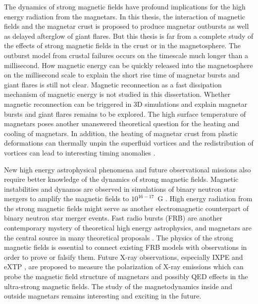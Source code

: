 The dynamics of strong magnetic fields have profound implications for the high energy radiation from the magnetars.
In this thesis, the interaction of magnetic fields and the magnetar crust is proposed to produce magnetar outbursts as well as delayed afterglow of giant flares.
But this thesis is far from a complete study of the effects of strong magnetic fields in the crust or in the magnetosphere.
The outburst model from crustal failures occurs on the timescale much longer than a millisecond.
How magnetic energy can be quickly released into the magnetosphere on the millisecond scale to explain the short rise time of magnetar bursts and giant flares is still not clear.
Magnetic reconnection as a fast dissipation mechanism of magnetic energy is not studied in this dissertation.
Whether magnetic reconnection can be triggered in 3D simulations and explain magnetar bursts and giant flares remains to be explored.
The high surface temperature of magnetars poses another unanswered theoretical question for the heating and cooling of magnetars.
In addition, the heating of magnetar crust from plastic deformations can thermally unpin the superfluid vortices and the redistribution of vortices can lead to interesting timing anomalies \citep{1996ApJ...457..844L}.

New high energy astrophysical phenomena and future observational missions also require better knowledge of the dynamics of strong magnetic fields.
Magnetic instabilities and dynamos are observed in simulations of binary neutron star mergers to amplify the magnetic fields to $10^{16-17}$~G \citep{2014PhRvD..90d1502K,2015ApJ...809...39G}.
High energy radiation from the strong magnetic fields might serve as another electromagnetic counterpart of binary neutron star merger events.
Fast radio bursts (FRB) are another contemporary mystery of theoretical high energy astrophysics, and magnetars are the central source in many theoretical proposals \citep{2017MNRAS.468.2726K,2018ApJ...868L...4M,2019MNRAS.485.4091M}.
The physics of the strong magnetic fields is essential to connect existing FRB models with observations in order to prove or falsify them.
Future X-ray observations, especially IXPE \citep{WEISSKOPF20161179} and eXTP \citep{2016SPIE.9905E..1QZ}, are proposed to measure the polarization of X-ray emissions which can probe the magnetic field structure of magnetars and possibly QED effects in the ultra-strong magnetic fields.
The study of the magnetodynamics inside and outside magnetars remains interesting and exciting in the future.





